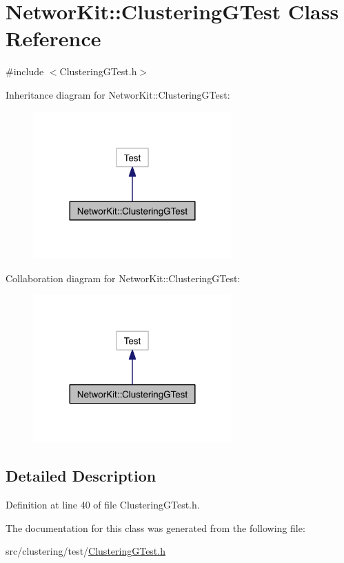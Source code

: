 \hypertarget{class_networ_kit_1_1_clustering_g_test}{\section{Networ\-Kit\-:\-:Clustering\-G\-Test Class Reference}
\label{class_networ_kit_1_1_clustering_g_test}
}


{\ttfamily \#include $<$Clustering\-G\-Test.\-h$>$}



Inheritance diagram for Networ\-Kit\-:\-:Clustering\-G\-Test\-:\nopagebreak
\begin{figure}[H]
\begin{center}
\leavevmode
\includegraphics[width=216pt]{class_networ_kit_1_1_clustering_g_test__inherit__graph}
\end{center}
\end{figure}


Collaboration diagram for Networ\-Kit\-:\-:Clustering\-G\-Test\-:\nopagebreak
\begin{figure}[H]
\begin{center}
\leavevmode
\includegraphics[width=216pt]{class_networ_kit_1_1_clustering_g_test__coll__graph}
\end{center}
\end{figure}


\subsection{Detailed Description}


Definition at line 40 of file Clustering\-G\-Test.\-h.



The documentation for this class was generated from the following file\-:\begin{DoxyCompactItemize}
\item 
src/clustering/test/\hyperlink{_clustering_g_test_8h}{Clustering\-G\-Test.\-h}\end{DoxyCompactItemize}
